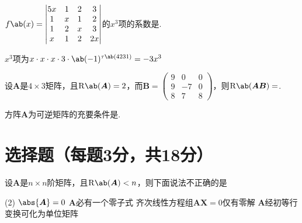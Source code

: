 \begin{exercise}
$f\ab(x)=
\begin{vmatrix}
    5x & 1 & 2 & 3\\
    1 & x & 1 & 2\\
    1 & 2 & x & 3\\
    x & 1 & 2 & 2x
\end{vmatrix}
$的$x^3$项的系数是.
\end{exercise}
\begin{solution}
    $x^3$项为$x\cdot x\cdot x\cdot 3\cdot\ab(-1)^{\tau\ab(4231)}=-3x^3$
\end{solution}

\begin{exercise}
设$\boldsymbol{A}$是$4\times 3$矩阵，且$\mathrm{R}\ab(\boldsymbol{A})=2$，而$\boldsymbol{B}=
\begin{pmatrix}
9 & 0 & 0\\
9 & -7 & 0\\
8 & 7 & 8    
\end{pmatrix}$，则$\mathrm{R}\ab(\boldsymbol{AB})=$.
\end{exercise}
\begin{solution}
    
\end{solution}

\begin{exercise}
    方阵$\boldsymbol{A}$为可逆矩阵的充要条件是.
\end{exercise}
\begin{solution}
    
\end{solution}

\section{选择题（每题3分，共18分）}
\vspace{-1em}
\begin{exercise}
    设$\boldsymbol{A}$是$n\times n$阶矩阵，且$\mathrm{R}\ab(\boldsymbol{A})<n$，则下面说法不正确的是\ans{}
    \begin{tasks}(2)
        \task $\abs{\boldsymbol{A}}=0$
        \task $\boldsymbol{A}$必有一个零子式
        \task 齐次线性方程组$\boldsymbol{AX}=0$仅有零解
        \task $\boldsymbol{A}$经初等行变换可化为单位矩阵
    \end{tasks}
\end{exercise}
\begin{solution}
    
\end{solution}

